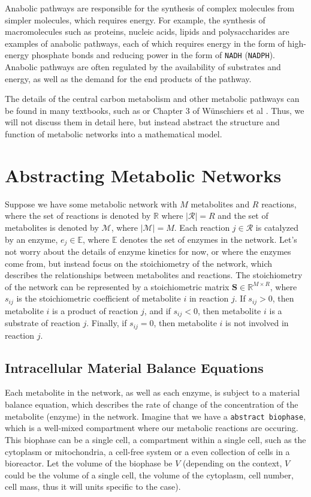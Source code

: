 \documentclass{article}[12pt]
\def\R{\mathbb{R}}
\def\E{\mathbb{E}}
\begin{document}
Anabolic pathways are responsible for the synthesis of complex molecules from simpler molecules, which requires energy.
For example, the synthesis of macromolecules such as proteins, nucleic acids, lipids and polysaccharides are examples of anabolic pathways, 
each of which requires energy in the form of high-energy phosphate bonds and reducing power in the form of \texttt{NADH} (\texttt{NADPH}).
Anabolic pathways are often regulated by the availability of substrates and energy, as well as the demand for the end products of the pathway.

The details of the central carbon metabolism and other metabolic pathways can be found in many textbooks, such as \cite{Palsson2015} or Chapter 3 of Wünschiers et al \cite{Metabolism}.
Thus, we will not discuss them in detail here, but instead abstract the structure and function of metabolic networks into a mathematical model.

\section{Abstracting Metabolic Networks}
Suppose we have some metabolic network with $M$ metabolites and $R$ reactions, where the set of reactions is denoted by $\R$ where $|\mathcal{R}|=R$ and the set of metabolites is denoted by $\mathcal{M}$, where $|\mathcal{M}|=M$.
Each reaction $j \in \mathcal{R}$ is catalyzed by an enzyme, $e_{j}\in\E$, where $\E$ denotes the set of enzymes in the network. 
Let's not worry about the details of enzyme kinetics for now, or where the enzymes come from, but instead focus on the stoichiometry of the network, which describes the relationships between metabolites and reactions.
The stoichiometry of the network can be represented by a stoichiometric matrix $\mathbf{S} \in \R^{M \times R}$, where $s_{ij}$ is the stoichiometric coefficient of metabolite $i$ in reaction $j$.
If $s_{ij} > 0$, then metabolite $i$ is a product of reaction $j$, and if $s_{ij} < 0$, then metabolite $i$ is a substrate of reaction $j$.
Finally, if $s_{ij} = 0$, then metabolite $i$ is not involved in reaction $j$. 

\subsection{Intracellular Material Balance Equations}
Each metabolite in the network, as well as each enzyme, is subject to a material balance equation, which describes the rate of change of the concentration of the metabolite (enzyme) in the network.
Imagine that we have a \texttt{abstract biophase}, which is a well-mixed compartment where our metabolic reactions are occuring.
This biophase can be a single cell, a compartment within a single cell, such as the cytoplasm or mitochondria, a cell-free system or a even collection of cells in 
a bioreactor. Let the volume of the biophase be $V$ (depending on the context, $V$ could be the volume of a single cell, the volume of the cytoplasm, cell number, cell mass, thus it will units specific to the case).
\end{document}
